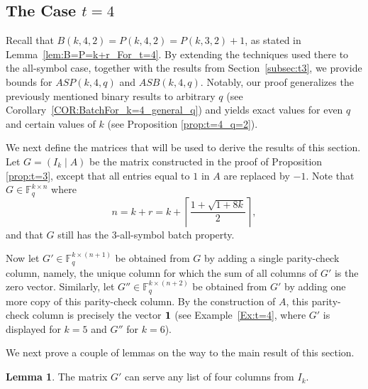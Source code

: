\documentclass[11pt,a4paper]{article}
\theoremstyle{definition}
\newtheorem{lemma}[theorem]{Lemma}
\newcommand{\F}{\mathbb{F}}
\begin{document}
\subsection{The Case $t=4$}

Recall that $B(k,4,2) = P(k,4,2) = P(k,3,2) + 1$, as 
stated in Lemma~\ref{lem:B=P=k+r_For_t=4}. By 
extending the techniques used there to the 
all-symbol case, together with the results from Section~\ref{subsec:t3}, we provide bounds for $ASP(k,4,q)$ and $ASB(k,4,q)$. Notably, our proof generalizes the previously 
mentioned binary results to arbitrary $q$ (see 
Corollary~\ref{COR:BatchFor_k=4_general_q}) and 
yields exact values for even $q$ and certain values of $k$ (see Proposition \ref{prop:t=4_q=2}).

We next define the matrices that will be used to derive the results of this section. Let $G = (I_k \mid A)$ be the matrix constructed in the proof of Proposition \ref{prop:t=3}, except that all entries equal to $1$ in $A$ are replaced by $-1$. Note that $G \in \F_q^{k \times n}$ where $$n = k + r = k + \left\lceil \frac{1 + \sqrt{1 + 8k}}{2}\right\rceil,$$ and that $G$ still has the $3$-all-symbol batch property. 

Now let \(G'\in\F_q^{k\times(n+1)}\) be obtained from \(G\) by adding a single parity-check column, namely, the unique column for which the sum of all columns of \(G'\) is the zero vector. Similarly, let \(G''\in\F_q^{k\times(n+2)}\) be obtained from \(G'\) by adding one more copy of this parity-check column. By the construction of \(A\), this parity-check column is precisely the vector $\bf1$ (see Example~\ref{Ex:t=4}, where \(G'\) is displayed for \(k=5\) and \(G''\) for \(k=6\)).
 

We next prove a couple of lemmas on the way to the main result of this section.
\begin{lemma}\label{Lem:G'IsBatch}
    The matrix $G'$ can serve any list of four columns from $I_k$.
\end{lemma}
\end{document}

